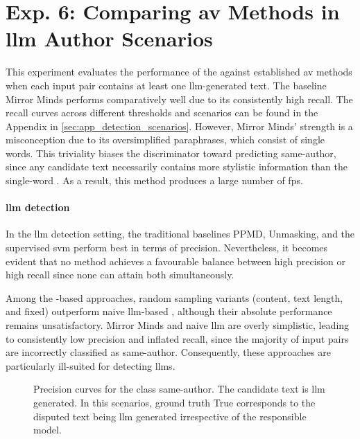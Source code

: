 \section{Exp. 6: Comparing \acs{av} Methods in \acs{llm} Author Scenarios}
\label{sec:results_llm_av}

This experiment evaluates the performance of the \impAppr{} against established \ac{av} methods when each input pair contains at least one \ac{llm}-generated text.  
The baseline Mirror Minds performs comparatively well due to its consistently high recall.  
The recall curves across different thresholds and scenarios can be found in the Appendix in \autoref{sec:app_detection_scenarios}.  
However, Mirror Minds' strength is a misconception due to its oversimplified paraphrases, which consist of single words.  
This triviality biases the discriminator toward predicting same-author, since any candidate text necessarily contains more stylistic information than the single-word \imps{}.  
As a result, this method produces a large number of \acp{fp}.


\paragraph{\ac{llm} detection}

In the \ac{llm} detection setting, the traditional baselines PPMD, Unmasking, and the supervised \ac{svm} perform best in terms of precision.  
Nevertheless, it becomes evident that no method achieves a favourable balance between high precision or high recall since none can attain both simultaneously.  

Among the \imp{}-based approaches, random sampling variants (content, text length, and fixed) outperform naive \ac{llm}-based \imps{}, although their absolute performance remains unsatisfactory.  
Mirror Minds and naive \ac{llm} \imps{} are overly simplistic, leading to consistently low precision and inflated recall, since the majority of input pairs are incorrectly classified as same-author.  
Consequently, these approaches are particularly ill-suited for detecting \acp{llm}.

\begin{figure}[h]
  
\caption{Precision curves for the class same-author. 
The candidate text is \ac{llm} generated.
In this scenarios, ground truth True corresponds to the disputed text being \ac{llm} generated irrespective of the responsible model.
}
\label{fig:llm_detection_prec}
\end{figure}

